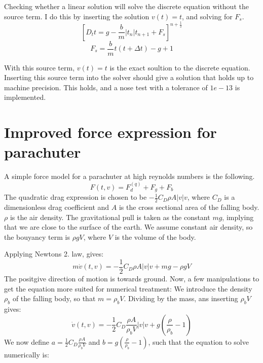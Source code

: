 \documentclass[a4paper, 10pt]{article}
\begin{document}
Checking whether a linear solution will solve the discrete equation without the source term. I do this by inserting the solution $v(t) = t$, and solving for $F_s$.  
\begin{equation}
	\left[D_t t = g - \frac{b}{m} |t_n|t_{n+1} + F_s\right]^{n+\frac{1}{2}}
\end{equation}
\begin{equation}
	F_s = \frac{b}{m} t(t+\Delta t) - g + 1 
\end{equation}

With this source term, $v(t) = t$ is the exact soultion to the discrete equation. Inserting this source term into the solver should give a solution that holds up to machine precision. This holds, and a nose test with a tolerance of $1e-13$ is implemented.

\section{Improved force expression for parachuter}
A simple force model for a parachuter at high reynolds numbers is the following.
\begin{equation}
	F(t, v) = F_d^{(q)} + F_g + F_b
\end{equation}
The quadratic drag expression is chosen to be $-\frac{1}{2}C_D \rho A |v|v$, where $C_D$ is a dimensionless drag coefficient and $A$ is the cross sectional area of the falling body. $\rho$ is the air density. The gravitational pull is taken as the constant $mg$, implying that we are close to the surface of the earth. We assume constant air density, so the bouyancy term is $\rho g V$, where $V$ is the volume of the body. 

Applying Newtons 2. law, gives:
\begin{equation}
	m\dot{v}(t, v) = -\frac{1}{2}C_D \rho A |v|v + mg - \rho g V
\end{equation}
The positgive direction of motion is towards ground.
Now, a few manipulations to get the equation more suited for numerical treatment:
We introduce the density $\rho_b$ of the falling body, so that $m = \rho_b V$. Dividing by the mass, ans inserting $\rho_b V$ gives:
\begin{equation}
	\dot{v}(t, v) = -\frac{1}{2} C_D \frac{\rho A}{\rho_b V}|v|v + g\left( \frac{\rho}{\rho_b}-1 \right) 
\end{equation}
We now define 
$a = \frac{1}{2} C_D \frac{\rho A}{\rho_b V}$ 
and 
$b = g\left( \frac{\rho}{\rho_b} - 1\right)$, 
such that the equation to solve numerically is:
\end{document}
